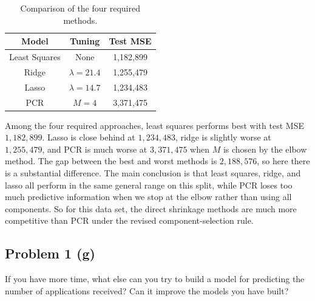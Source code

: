 \documentclass[
  10pt,
]{extarticle}
\begin{document}
\begin{table}[H]
\centering
\caption{\label{tab:unnamed-chunk-9}Comparison of the four required methods.}
\centering
\begin{tabular}[t]{ccc}
\toprule
Model & Tuning & Test MSE\\
\midrule
Least Squares & None & 1,182,899\\
Ridge & $\lambda = 21.4$ & 1,255,479\\
Lasso & $\lambda = 14.7$ & 1,234,483\\
PCR & $M = 4$ & 3,371,475\\
\bottomrule
\end{tabular}
\end{table}

Among the four required approaches, least squares performs best with test MSE \(1{,}182{,}899\). Lasso is close behind at \(1{,}234{,}483\), ridge is slightly worse at \(1{,}255{,}479\), and PCR is much worse at \(3{,}371{,}475\) when \(M\) is chosen by the elbow method. The gap between the best and worst methods is \(2{,}188{,}576\), so here there is a substantial difference. The main conclusion is that least squares, ridge, and lasso all perform in the same general range on this split, while PCR loses too much predictive information when we stop at the elbow rather than using all components. So for this data set, the direct shrinkage methods are much more competitive than PCR under the revised component-selection rule.

\newpage

\subsection{Problem 1 (g)}\label{problem-1-g}

\begin{problem}[Problem 1 (g)]
If you have more time, what else can you try to build a model for predicting the number of applications received? Can it improve the models you have built?
\end{problem}
\end{document}
